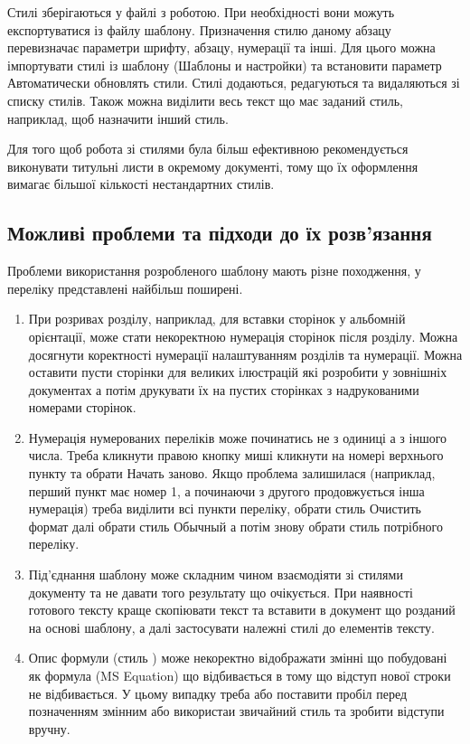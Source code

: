 Стилі зберігаються у файлі з роботою. При необхідності вони можуть експортуватися із файлу шаблону. Призначення стилю даному абзацу перевизначає параметри шрифту, абзацу, нумерації та інші. Для цього можна імпортувати стилі із шаблону (Шаблоны и настройки) та встановити параметр Автоматически обновлять стили. Стилі додаються, редагуються та видаляються зі списку стилів. Також можна виділити весь текст що має заданий стиль, наприклад, щоб назначити інший стиль. 

Для того щоб робота зі стилями була більш ефективною рекомендується виконувати титульні листи в окремому документі, тому що їх оформлення вимагає більшої кількості нестандартних стилів.

\subsection{Можливі проблеми та підходи до їх розв’язання}

Проблеми використання розробленого шаблону мають різне походження, у переліку представлені найбільш поширені.
\begin{enumerate}
\item При розривах розділу, наприклад, для вставки сторінок у альбомній орієнтації, може стати некоректною нумерація сторінок після розділу. Можна досягнути коректності нумерації налаштуванням розділів та нумерації. Можна оставити пусти сторінки для великих ілюстрацій які розробити у зовнішніх документах а потім друкувати їх на пустих сторінках з надрукованими номерами сторінок.
\item Нумерація нумерованих переліків може починатись не з одиниці а з іншого числа. Треба кликнути правою кнопку миші кликнути на номері верхнього пункту та обрати Начать заново. Якщо проблема залишилася (наприклад, перший пункт має номер 1, а починаючи з другого продовжується інша нумерація) треба виділити всі пункти переліку, обрати стиль Очистить формат далі обрати стиль Обычный а потім знову обрати стиль потрібного переліку.
\item Під’єднання шаблону може складним чином взаємодіяти зі стилями документу та не давати того результату що очікується. При наявності готового тексту краще скопіювати текст та вставити в документ що розданий на основі шаблону, а далі застосувати належні стилі до елементів тексту.
\item Опис формули (стиль ) може некоректно відображати змінні що побудовані як формула (MS Equation) що відбивається в тому що відступ нової строки не відбивається. У цьому випадку треба або поставити пробіл перед позначенням змінним або використаи звичайний стиль та зробити відступи вручну. 
\end{enumerate}

